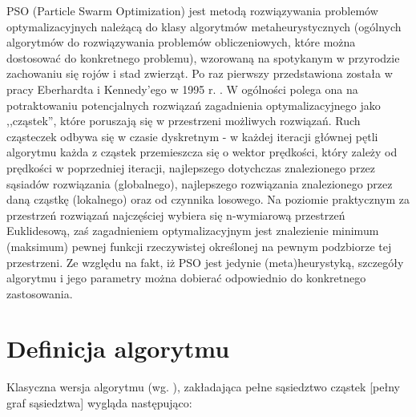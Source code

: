 \documentclass[12pt, twoside, openany, abstract=on]{report}
\theoremstyle{definition}
\begin{document}
PSO (Particle Swarm Optimization) jest metodą rozwiązywania problemów optymalizacyjnych należącą do klasy algorytmów metaheurystycznych (ogólnych algorytmów do rozwiązywania problemów obliczeniowych, które można dostosować do konkretnego problemu), wzorowaną na spotykanym w przyrodzie zachowaniu się rojów i stad zwierząt. Po raz pierwszy przedstawiona została w pracy Eberhardta  i Kennedy’ego w 1995 r. \cite{Pso}. W ogólności polega ona na potraktowaniu potencjalnych rozwiązań zagadnienia optymalizacyjnego jako ,,cząstek'', które poruszają się w przestrzeni możliwych rozwiązań. Ruch cząsteczek odbywa się w czasie dyskretnym - w każdej iteracji głównej pętli algorytmu każda z cząstek przemieszcza się o wektor prędkości, który zależy od prędkości w poprzedniej iteracji, najlepszego dotychczas znalezionego przez sąsiadów rozwiązania (globalnego), najlepszego rozwiązania znalezionego przez daną cząstkę (lokalnego) oraz od czynnika losowego. Na poziomie praktycznym za przestrzeń rozwiązań najczęściej wybiera się n-wymiarową przestrzeń Euklidesową, zaś zagadnieniem optymalizacyjnym jest znalezienie minimum (maksimum) pewnej funkcji rzeczywistej określonej na pewnym podzbiorze tej przestrzeni. Ze względu na fakt, iż PSO jest jedynie (meta)heurystyką, szczegóły algorytmu i jego parametry można dobierać odpowiednio do konkretnego zastosowania.


\section{Definicja algorytmu} %

 
Klasyczna wersja algorytmu (wg. \cite{Pso}), zakładająca pełne sąsiedztwo cząstek [pełny graf sąsiedztwa] wygląda następująco:
\end{document}
